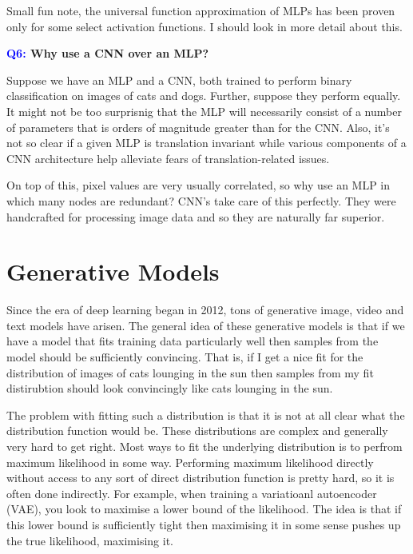 \documentclass[11pt]{article}
\begin{document}
Small fun note, the universal function approximation of MLPs has been proven only for some select activation functions. I should look in more detail about this.

\begin{center}
    \textbf{\textcolor{blue}{Q6:} Why use a CNN over an MLP?}
\end{center}
Suppose we have an MLP and a CNN, both trained to perform binary classification on images of cats and dogs. Further, suppose they perform equally. It might not be too surprisnig that the MLP will necessarily consist of a number of parameters that is orders of magnitude greater than for the CNN. Also, it's not so clear if a given MLP is translation invariant while various components of a CNN architecture help alleviate fears of translation-related issues.

On top of this, pixel values are very usually correlated, so why use an MLP in which many nodes are redundant? CNN's take care of this perfectly. They were handcrafted for processing image data and so they are naturally far superior. 

\newpage
\section{Generative Models}

Since the era of deep learning began in 2012, tons of generative image, video and text models have arisen. The general idea of these generative models is that if we have a model that fits training data particularly well then samples from the model should be sufficiently convincing. That is, if I get a nice fit for the distribution of images of cats lounging in the sun then samples from my fit distirubtion should look convincingly like cats lounging in the sun.

The problem with fitting such a distribution is that it is not at all clear what the distribution function would be. These distributions are complex and generally very hard to get right. Most ways to fit the underlying distribution is to perfrom maximum likelihood in some way. Performing maximum likelihood directly without access to any sort of direct distribution function is pretty hard, so it is often done indirectly. For example, when training a variatioanl autoencoder (VAE), you look to maximise a lower bound of the likelihood. The idea is that if this lower bound is sufficiently tight then maximising it in some sense pushes up the true likelihood, maximising it.
\end{document}
